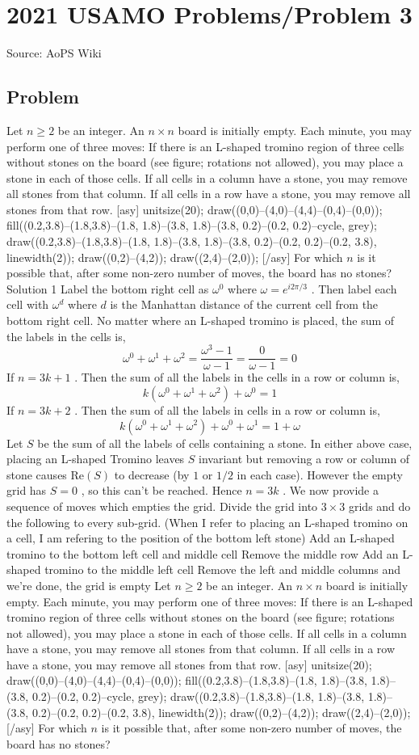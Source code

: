 \documentclass[12pt]{article}
\begin{document}
\section*{{2021 USAMO Problems/Problem 3}}
Source: AoPS Wiki

\subsection*{Problem}
Let $n \geq 2$ be an integer. An $n \times n$ board is initially empty. Each minute, you may perform one of three moves: If there is an L-shaped tromino region of three cells without stones on the board (see figure; rotations not allowed), you may place a stone in each of those cells. If all cells in a column have a stone, you may remove all stones from that column. If all cells in a row have a stone, you may remove all stones from that row. [asy] unitsize(20); draw((0,0)--(4,0)--(4,4)--(0,4)--(0,0)); fill((0.2,3.8)--(1.8,3.8)--(1.8, 1.8)--(3.8, 1.8)--(3.8, 0.2)--(0.2, 0.2)--cycle, grey); draw((0.2,3.8)--(1.8,3.8)--(1.8, 1.8)--(3.8, 1.8)--(3.8, 0.2)--(0.2, 0.2)--(0.2, 3.8), linewidth(2)); draw((0,2)--(4,2)); draw((2,4)--(2,0)); [/asy] For which $n$ is it possible that, after some non-zero number of moves, the board has no stones? Solution 1 Label the bottom right cell as $\omega^0$ where $\omega = e^{i2\pi/3}$ . Then label each cell with $\omega^d$ where $d$ is the Manhattan distance of the current cell from the bottom right cell. No matter where an L-shaped tromino is placed, the sum of the labels in the cells is, \[\omega^0 + \omega^1 + \omega^2 = \frac{\omega^3 - 1}{\omega - 1} = \frac{0}{\omega - 1} = 0\] If $n = 3k + 1$ . Then the sum of all the labels in the cells in a row or column is, \[k(\omega^0 + \omega^1 + \omega^2)+\omega^0 = 1\] If $n = 3k + 2$ . Then the sum of all the labels in cells in a row or column is, \[k(\omega^0 + \omega^1 + \omega^2) + \omega^0 + \omega^1 = 1 + \omega\] Let $S$ be the sum of all the labels of cells containing a stone. In either above case, placing an L-shaped Tromino leaves $S$ invariant but removing a row or column of stone causes $\textrm{Re}(S)$ to decrease (by $1$ or $1/2$ in each case). However the empty grid has $S=0$ , so this can't be reached. Hence $n=3k$ . We now provide a sequence of moves which empties the grid. Divide the grid into $3\times 3$ grids and do the following to every sub-grid. (When I refer to placing an L-shaped tromino on a cell, I am refering to the position of the bottom left stone) Add an L-shaped tromino to the bottom left cell and middle cell Remove the middle row Add an L-shaped tromino to the middle left cell Remove the left and middle columns and we're done, the grid is empty Let $n \geq 2$ be an integer. An $n \times n$ board is initially empty. Each minute, you may perform one of three moves: If there is an L-shaped tromino region of three cells without stones on the board (see figure; rotations not allowed), you may place a stone in each of those cells. If all cells in a column have a stone, you may remove all stones from that column. If all cells in a row have a stone, you may remove all stones from that row. [asy] unitsize(20); draw((0,0)--(4,0)--(4,4)--(0,4)--(0,0)); fill((0.2,3.8)--(1.8,3.8)--(1.8, 1.8)--(3.8, 1.8)--(3.8, 0.2)--(0.2, 0.2)--cycle, grey); draw((0.2,3.8)--(1.8,3.8)--(1.8, 1.8)--(3.8, 1.8)--(3.8, 0.2)--(0.2, 0.2)--(0.2, 3.8), linewidth(2)); draw((0,2)--(4,2)); draw((2,4)--(2,0)); [/asy] For which $n$ is it possible that, after some non-zero number of moves, the board has no stones?
\end{document}

